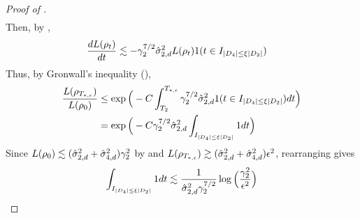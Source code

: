 \begin{proof}[Proof of ]
\begin{align}
\end{align}
Then, by ,
\begin{align}
\frac{dL(\rho_t)}{dt}
& \lesssim -\gamma_2^{7/2} \hat{\sigma}_{2, d}^2 L(\rho_t) 1(t \in I_{|D_4| \leq \xi |D_2|})
\end{align}
Thus, by Gronwall's inequality (),
\begin{align}
\frac{L(\rho_{T_{*, \epsilon}})}{L(\rho_0)}
& \leq \exp\Big(-C \int_{T_2}^{T_{*, \epsilon}} \gamma_2^{7/2} \hat{\sigma}_{2, d}^2 1(t \in I_{|D_4| \leq \xi |D_2|}) dt \Big) \\
& = \exp\Big(-C \gamma_2^{7/2} \hat{\sigma}_{2, d}^2 \int_{I_{|D_4| \leq \xi |D_2|}} 1 dt \Big)
\end{align}
Since $L(\rho_0) \lesssim (\hat{\sigma}_{2, d}^2 + \hat{\sigma}_{4, d}^2) \gamma_2^2$ by  and $L(\rho_{T_{*, \epsilon}}) \gtrsim (\hat{\sigma}_{2, d}^2 + \hat{\sigma}_{4, d}^2) \epsilon^2$, rearranging gives
\begin{align} \label{eq:phase3_case1_timebound_A}
\int_{I_{|D_4| \leq \xi |D_2|}} 1 dt \lesssim \frac{1}{\hat{\sigma}_{2, d}^2 \gamma_2^{7/2}} \log\Big(\frac{\gamma_2^2}{\epsilon^2}\Big)
\end{align}


\end{proof}
